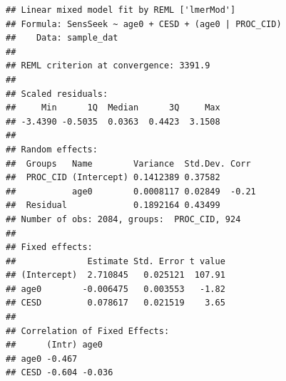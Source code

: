 \documentclass[]{article}
\begin{document}
\begin{verbatim}
## Linear mixed model fit by REML ['lmerMod']
## Formula: SensSeek ~ age0 + CESD + (age0 | PROC_CID)
##    Data: sample_dat
## 
## REML criterion at convergence: 3391.9
## 
## Scaled residuals: 
##     Min      1Q  Median      3Q     Max 
## -3.4390 -0.5035  0.0363  0.4423  3.1508 
## 
## Random effects:
##  Groups   Name        Variance  Std.Dev. Corr 
##  PROC_CID (Intercept) 0.1412389 0.37582       
##           age0        0.0008117 0.02849  -0.21
##  Residual             0.1892164 0.43499       
## Number of obs: 2084, groups:  PROC_CID, 924
## 
## Fixed effects:
##              Estimate Std. Error t value
## (Intercept)  2.710845   0.025121  107.91
## age0        -0.006475   0.003553   -1.82
## CESD         0.078617   0.021519    3.65
## 
## Correlation of Fixed Effects:
##      (Intr) age0  
## age0 -0.467       
## CESD -0.604 -0.036
\end{verbatim}

\normalsize
\end{document}
